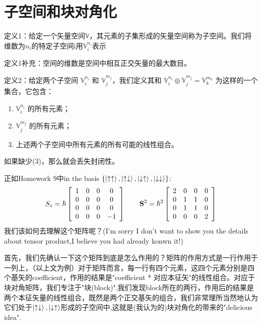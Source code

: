 \section{子空间和块对角化}
定义1：给定一个矢量空间$\mathbb{V}$，其元素的子集形成的矢量空间称为子空间。我们将维数为$n_i$的特定子空间i用$\mathbb{V}_i^{n_i}$表示\par
定义1补充：空间的维数是空间中相互正交矢量的最大数目。\par
定义2：给定两个子空间 $\mathbb{V}_i^{n_i}$ 和 $\mathbb{V}_j^{m_j}$，我们定义其和 $\mathbb{V}_i^{n_i} \oplus \mathbb{V}_j^{m_j} = \mathbb{V}_k^{m_k}$ 为这样的一个集合，它包含：
\begin{enumerate}
	\item[(1)] $\mathbb{V}_i^{n_i}$ 的所有元素；
	\item[(2)] $\mathbb{V}_j^{m_j}$ 的所有元素；
	\item[(3)] 上述两个子空间中所有元素的所有可能的线性组合。
\end{enumerate}
如果缺少(3)，那么就会丢失封闭性。\par
正如Homework 9中in the basis $\{\ket{ \uparrow \uparrow }, \ket{\uparrow \downarrow}, \ket{\downarrow \uparrow}, \ket{\downarrow \downarrow}\}$:
\begin{equation}
	{S_z} = \hbar \left[ {\begin{array}{*{20}{c}}
			1&0&0&0\\
			0&0&0&0\\
			0&0&0&0\\
			0&0&0&{ - 1}
	\end{array}} \right]
	\qquad{{\bf{S}}^2} = {\hbar ^2}\left[ {\begin{array}{*{20}{c}}
			2&0&0&0\\
			0&1&1&0\\
			0&1&1&0\\
			0&0&0&2
	\end{array}} \right]
\end{equation}
我们该如何去理解这个矩阵呢？(I'm sorry I don't want to show you the details about tensor product,I believe you had already konwn it!)\par
首先，我们先确认一下这个矩阵到底是怎么作用的？矩阵的作用方式是一行作用于一列上，（以上文为例）对于矩阵而言，每一行有四个元素，这四个元素分别是四个基矢的coefficient，作用的结果是"coefficient * 对应本征矢"的线性组合。对应于块对角矩阵，我们专注于"块(block)",我们发现block所在的两行，作用后的结果是两个本征矢量的线性组合，既然是两个正交基矢的组合，我们非常理所当然地认为它们处于$\ket{\uparrow \downarrow}, \ket{\downarrow \uparrow}$形成的子空间中,这就是(我认为的)块对角化的带来的"delicious idea".\par
